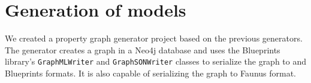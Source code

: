 \section{Generation of models}

We created a property graph generator project based on the previous \tb{} generators. The generator creates a graph in a Neo4j database and uses the Blueprints library's \texttt{GraphMLWriter} and \texttt{GraphSONWriter} classes to serialize the graph to \graphml{} and Blueprints \graphson{} formats. It is also capable of serializing the graph to Faunus \graphson{} format.
